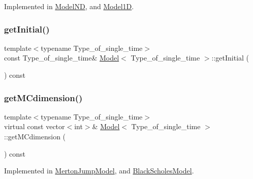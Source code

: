 Implemented in \hyperlink{class_model_n_d_ab2356536a38f4961257654de629d6093}{Model\+ND}, and \hyperlink{class_model1_d_ac81875523be6153cb58d0f37914eb9a1}{Model1D}.

\hypertarget{class_model_a22cdf510508e6cf3adc69e2bcd9d151e}{}\label{class_model_a22cdf510508e6cf3adc69e2bcd9d151e} 
\subsubsection{\texorpdfstring{get\+Initial()}{getInitial()}}
{\footnotesize\ttfamily template$<$typename Type\+\_\+of\+\_\+single\+\_\+time$>$ \\
const Type\+\_\+of\+\_\+single\+\_\+time\& \hyperlink{class_model}{Model}$<$ Type\+\_\+of\+\_\+single\+\_\+time $>$\+::get\+Initial (\begin{DoxyParamCaption}{ }\end{DoxyParamCaption}) const\hspace{0.3cm}{\ttfamily [inline]}}

\hypertarget{class_model_a11fb36244c91ca8c36317581b73bca08}{}\label{class_model_a11fb36244c91ca8c36317581b73bca08} 
\subsubsection{\texorpdfstring{get\+M\+Cdimension()}{getMCdimension()}}
{\footnotesize\ttfamily template$<$typename Type\+\_\+of\+\_\+single\+\_\+time$>$ \\
virtual const vector$<$int$>$\& \hyperlink{class_model}{Model}$<$ Type\+\_\+of\+\_\+single\+\_\+time $>$\+::get\+M\+Cdimension (\begin{DoxyParamCaption}{ }\end{DoxyParamCaption}) const\hspace{0.3cm}{\ttfamily [pure virtual]}}



Implemented in \hyperlink{class_merton_jump_model_a6f901e305a9b852fd69aa7c6ff5da728}{Merton\+Jump\+Model}, and \hyperlink{class_black_scholes_model_a5665e6ea247e4f243082f5c98bbdbad6}{Black\+Scholes\+Model}.

\hypertarget{class_model_a6f584114ffcbd4eac04a2bbf8e9cede2}{}\label{class_model_a6f584114ffcbd4eac04a2bbf8e9cede2} 
